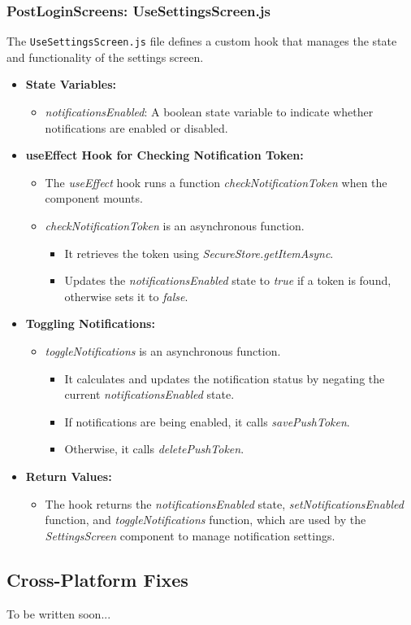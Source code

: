 \subsubsection{PostLoginScreens: UseSettingsScreen.js}

The \texttt{UseSettingsScreen.js} file defines a custom hook that manages the state and functionality of the settings screen.

\begin{itemize}
    \item \textbf{State Variables:}
    \begin{itemize}
        \item \textit{notificationsEnabled}: A boolean state variable to indicate whether notifications are enabled or disabled.
    \end{itemize}

    \item \textbf{useEffect Hook for Checking Notification Token:}
    \begin{itemize}
        \item The \textit{useEffect} hook runs a function \textit{checkNotificationToken} when the component mounts.
        \item \textit{checkNotificationToken} is an asynchronous function.
        \begin{itemize}
            \item It retrieves the token using \textit{SecureStore.getItemAsync}.
            \item Updates the \textit{notificationsEnabled} state to \textit{true} if a token is found, otherwise sets it to \textit{false}.
        \end{itemize}
    \end{itemize}

    \item \textbf{Toggling Notifications:}
    \begin{itemize}
        \item \textit{toggleNotifications} is an asynchronous function.
        \begin{itemize}
            \item It calculates and updates the notification status by negating the current \textit{notificationsEnabled} state.
            \item If notifications are being enabled, it calls \textit{savePushToken}.
            \item Otherwise, it calls \textit{deletePushToken}.
        \end{itemize}
    \end{itemize}

    \item \textbf{Return Values:}
    \begin{itemize}
        \item The hook returns the \textit{notificationsEnabled} state, \textit{setNotificationsEnabled} function, and \textit{toggleNotifications} function, which are used by the \textit{SettingsScreen} component to manage notification settings.
    \end{itemize}
\end{itemize}

\subsection{Cross-Platform Fixes}

To be written soon...
